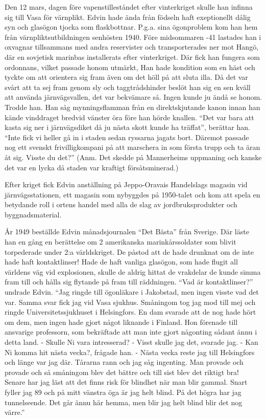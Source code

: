 Den 12 mars, dagen före vapenstilleståndet efter vinterkriget skulle han infinna sig till Vasa för värnplikt. Edvin hade ända från födseln haft exeptionellt dålig syn och glasögon tjocka som flaskbottnar. P.g.a. sina ögonproblem kom han hem från värnpliktsutbildningen senhösten 1940. Före midsommaren -41 lastades han i oxvagnar tillsammans med andra reservister och transporterades ner mot Hangö, där en sovjetisk marinbas installerats efter vinterkriget. Där fick han fungera som ordonnans, vilket passade honom utmärkt, Han hade kondition som en häst och tyckte om att orientera sig fram även om det höll på att sluta illa. Då det var svårt att ta sej fram genom sly och taggtrådshinder beslöt han sig en sen kväll att använda järnvägsvallen, det var bekvämare så. Ingen kunde ju ändå se honom. Trodde han. Han såg mynningsflamman från en direktskjutande kanon innan han kände vinddraget bredvid vänster öra före han hörde knallen. ``Det var bara att kasta sig ner i järnvägsdiket då ju nästa skott kunde ha träffat'', berättar han. ``Inte fick vi heller gå in i staden sedan ryssarna jagats bort. Däremot passade nog ett svenskt frivilligkompani på att marschera in som första trupp och ta äran åt sig. Visste du det?''
(Anm. Det skedde på Mannerheims uppmaning och kanske det var en lycka då staden var kraftigt försåtsminerad.)

Efter kriget fick Edvin anställning på Jeppo-Oravais Handelslags magasin vid järnvägsstationen, ett magasin som nybyggdes på 1950-talet och kom att spela en betydande roll i ortens handel med alla de slag av jordbruksprodukter och byggnadsmaterial.

År 1949 beställde Edvin månadsjournalen ``Det Bästa'' från Sverige. Där läste han en gång en berättelse om 2 amerikanska marinkårssoldater som blivit torpederade under 2:a världskriget. De påstod att de hade drunknat om de inte hade haft kontaktlinser! Hade de haft vanliga glasögon, som hade flugit all världens väg vid explosionen, skulle de aldrig hittat de vrakdelar de kunde simma fram till och hålla sig flytande på fram till räddningen. ``Vad är kontaktlinser?'' undrade Edvin. ``Jag ringde till ögonläkare i Jakobstad, men ingen visste vad det var. Samma svar fick jag vid Vasa sjukhus. Småningom tog jag mod till mej och ringde Universitetssjukhuset i Helsingfors. En dam svarade att de nog hade hört om dem, men ingen hade gjort något liknande i Finland. Hon förenade till ansvarige professorn, som bekräftade att man inte gjort någonting sådant ännu i detta land.\newline
\indent  - Skulle Ni vara intresserad? \newline
\indent  - Visst skulle jag det, svarade jag.\newline
\indent  - Kan Ni komma hit nästa vecka?, frågade han.\newline
\indent  - Nästa vecka reste jag till Helsingfors och länge var jag där. Tårarna rann och jag såg ingenting. Man provade och provade och så småningom blev det bättre och till sist blev det riktigt bra! Senare har jag läst att det finns risk för blindhet när man blir gammal. Snart fyller jag 89 och på mitt vänstra öga är jag helt blind. På det högra har jag tunnelseende. Det går ännu här hemma, men blir jag helt blind blir det nog värre.''

